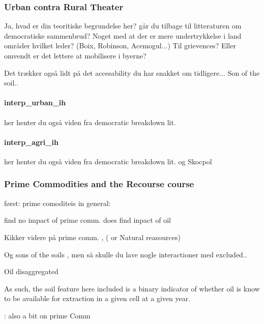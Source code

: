 \documentclass[a4paper]{article}
\begin{document}
\subsubsection{Urban contra Rural Theater} %

Ja, hvad er din teoritiske begrundelse her? går du tilbage til litteraturen om democratiske sammenbrud? Noget med at der er mere undertrykkelse i land områder hvilket leder? (Boix, Robinson, Acemogul...) Til grievences? Eller omvendt er det lettere at mobilisere i byerne?

Det trækker også lidt på det accesability du har snakket om tidligere... Son of the soil..

\paragraph{interp\_urban\_ih} her henter du også viden fra democratic breakdown lit.  
\paragraph{interp\_agri\_ih}  her henter du også viden fra democratic breakdown lit.  og Skocpol


\subsubsection{Prime Commodities and the Recourse course} %

først: prime comoditeis in general:
\cite{Collier_Hoeffler_1998, Collier_Hoeffler_2004}

find no impact of prime comm. \cite[76]{Fearon_Laitin_2003} does find inpact of oil \cite[84-86]{Fearon_Laitin_2003}


Kikker videre på prime comm. \cite{Fearon_2005}, ( or Natural reasources) \cite{Ross_2004}

Og sons of the soils \cite{Fearon_2004}, men så skulle du lave nogle interactioner med excluded..

\cite{Buhaug_2010} Oil disaggregated

As such, the soil feature here included is a binary indicator of whether oil is know to be available for extraction in a given cell at a given year. %

\cite{Hegre_Oestby_Raleigh_2009} : also a bit on prime Comm
\end{document}
